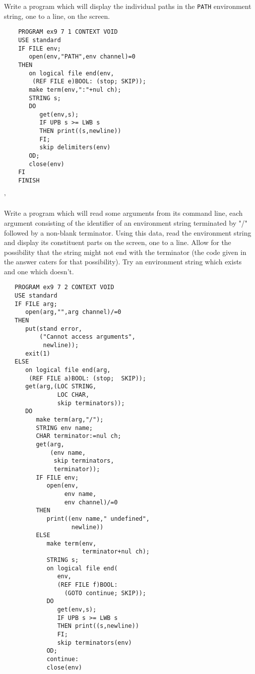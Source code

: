 \begin{exercise}
\item Write a program which will display the individual paths in the
\verb|PATH| environment string, one to a line, on the screen.
\ans \ %
\begin{verbatim}
    PROGRAM ex9 7 1 CONTEXT VOID
    USE standard
    IF FILE env;
       open(env,"PATH",env channel)=0
    THEN
       on logical file end(env,
        (REF FILE e)BOOL: (stop; SKIP));
       make term(env,":"+nul ch);
       STRING s;
       DO
          get(env,s);
          IF UPB s >= LWB s
          THEN print((s,newline))
          FI;
          skip delimiters(env)
       OD;
       close(env)
    FI
    FINISH
\end{verbatim}
'
\item Write a program which will read some arguments from its command
line, each argument consisting of the identifier of an environment
string terminated by "/" followed by a non-blank terminator. Using
this data, read the environment string and display its constituent
parts on the screen, one to a line. Allow for the possibility that
the string might not end with the terminator (the code given in the
answer caters for that possibility). Try an environment string
which exists and one which doesn't.
\ans \ %
\begin{verbatim}
   PROGRAM ex9 7 2 CONTEXT VOID
   USE standard
   IF FILE arg;
      open(arg,"",arg channel)/=0
   THEN
      put(stand error,
          ("Cannot access arguments",
           newline));
      exit(1)
   ELSE
      on logical file end(arg,
       (REF FILE a)BOOL: (stop;  SKIP));
      get(arg,(LOC STRING,
               LOC CHAR,
               skip terminators));
      DO
         make term(arg,"/");
         STRING env name;
         CHAR terminator:=nul ch;
         get(arg,
             (env name,
              skip terminators,
              terminator));
         IF FILE env;
            open(env,
                 env name,
                 env channel)/=0
         THEN
            print((env name," undefined",
                   newline))
         ELSE
            make term(env,
                      terminator+nul ch);
            STRING s;
            on logical file end(
               env,
               (REF FILE f)BOOL:
                 (GOTO continue; SKIP));
            DO
               get(env,s);
               IF UPB s >= LWB s
               THEN print((s,newline))
               FI;
               skip terminators(env)
            OD;
            continue:
            close(env)

\end{verbatim}
\end{exercise}
